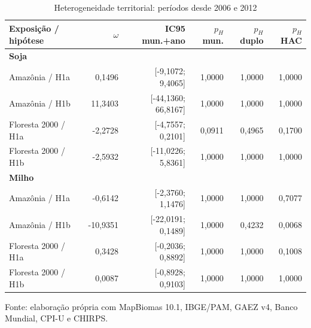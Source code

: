 \begin{table}[htbp]
\centering
\footnotesize
\setlength{\tabcolsep}{3pt}
\renewcommand{\arraystretch}{1.1}
\normalcaption\captionstyle{\centering}
\caption{Heterogeneidade territorial: períodos desde 2006 e 2012}
\label{tab:h1-instituicoes-alternativa}
\begin{tabular}{lrrrrr}
\hline
Exposição / hipótese & $\omega$ & IC95 mun.+ano & $p_H$ mun. & $p_H$ duplo & $p_H$ HAC \\
\hline\multicolumn{6}{l}{\textbf{Soja}} \\
Amazônia / H1a & 0,1496 & [-9,1072; 9,4065] & 1,0000 & 1,0000 & 1,0000 \\
Amazônia / H1b & 11,3403 & [-44,1360; 66,8167] & 1,0000 & 1,0000 & 1,0000 \\
Floresta 2000 / H1a & -2,2728 & [-4,7557; 0,2101] & 0,0911 & 0,4965 & 0,1700 \\
Floresta 2000 / H1b & -2,5932 & [-11,0226; 5,8361] & 1,0000 & 1,0000 & 1,0000 \\
\hline\multicolumn{6}{l}{\textbf{Milho}} \\
Amazônia / H1a & -0,6142 & [-2,3760; 1,1476] & 1,0000 & 1,0000 & 0,7077 \\
Amazônia / H1b & -10,9351 & [-22,0191; 0,1489] & 1,0000 & 0,4232 & 0,0068 \\
Floresta 2000 / H1a & 0,3428 & [-0,2036; 0,8892] & 1,0000 & 1,0000 & 0,1008 \\
Floresta 2000 / H1b & 0,0087 & [-0,8928; 0,9103] & 1,0000 & 1,0000 & 1,0000 \\
\hline\end{tabular}
\par\smallskip
\begin{minipage}{\textwidth}\footnotesize\centering
Fonte: elaboração própria com MapBiomas 10.1, IBGE/PAM, GAEZ v4, Banco Mundial, CPI-U e CHIRPS.
\end{minipage}
\end{table}
